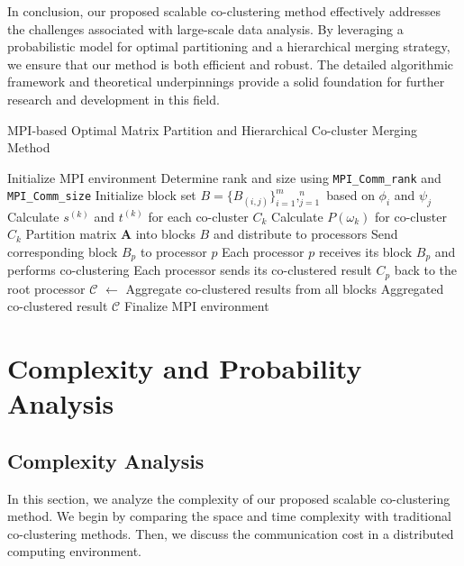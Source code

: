 \documentclass[journal]{IEEEtran}
\begin{document}
In conclusion, our proposed scalable co-clustering method effectively addresses the challenges associated with large-scale data analysis. By leveraging a probabilistic model for optimal partitioning and a hierarchical merging strategy, we ensure that our method is both efficient and robust. The detailed algorithmic framework and theoretical underpinnings provide a solid foundation for further research and development in this field.

\begin{algorithm}[!t]
  \caption{MPI-based Optimal Matrix Partition and Hierarchical Co-cluster Merging Method}\label{alg:mpi_method}
  \begin{algorithmic}[1]
    \STATE Initialize MPI environment
    \STATE Determine rank and size using \texttt{MPI\_Comm\_rank} and \texttt{MPI\_Comm\_size}
    \STATE Initialize block set $B = \{B_{(i,j)}\}_{i=1}^m,_{j=1}^n$ based on $\phi_i$ and $\psi_j$
    \STATE Calculate $s^{(k)}$ and $t^{(k)}$ for each co-cluster $C_k$
    \STATE Calculate $P(\omega_k)$ for co-cluster $C_k$
    \STATE Partition matrix $\mathbf{A}$ into blocks $B$ and distribute to processors
    \STATE Send corresponding block $B_p$ to processor $p$
    \ENDFOR
    \ENDIF
    \ENDFOR
    \ENDIF
    \STATE Each processor $p$ receives its block $B_p$ and performs co-clustering
    \STATE Each processor sends its co-clustered result $C_p$ back to the root processor
    \STATE $\mathcal{C}$ $\gets$ Aggregate co-clustered results from all blocks
    \RETURN Aggregated co-clustered result $\mathcal{C}$
    \ENDIF
    \STATE Finalize MPI environment
  \end{algorithmic}
\end{algorithm}

\section{Complexity and Probability Analysis}

\label{sec:analysis}

\subsection{Complexity Analysis}
\label{subsubsec:complexity}
In this section, we analyze the complexity of our proposed scalable co-clustering method. We begin by comparing the space and time complexity with traditional co-clustering methods. Then, we discuss the communication cost in a distributed computing environment.
\end{document}

